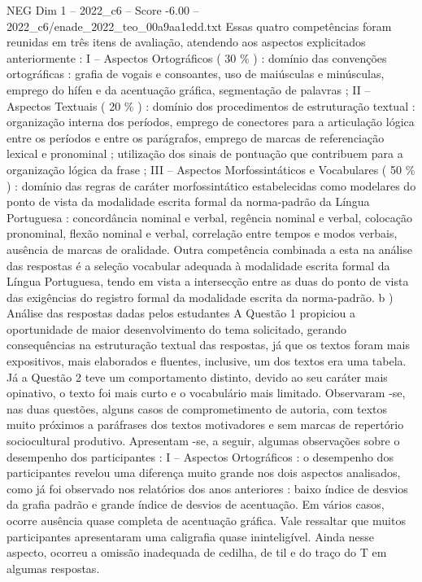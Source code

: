 \begin{textsample}{NEG Dim 1 – 2022\_c6 – Score -6.00 – 2022\_c6/enade\_2022\_teo\_00a9aa1edd.txt}
Essas quatro competências foram reunidas em três itens de avaliação, atendendo aos aspectos explicitados anteriormente : I – Aspectos Ortográficos ( 30 \% ) : domínio das convenções ortográficas : grafia de vogais e consoantes, uso de maiúsculas e minúsculas, emprego do hífen e da acentuação gráfica, segmentação de palavras ; II – Aspectos Textuais ( 20 \% ) : domínio dos procedimentos de estruturação textual : organização interna dos períodos, emprego de conectores para a articulação lógica entre os períodos e entre os parágrafos, emprego de marcas de referenciação lexical e pronominal ; utilização dos sinais de pontuação que contribuem para a organização lógica da frase ; III – Aspectos Morfossintáticos e Vocabulares ( 50 \% ) : domínio das regras de caráter morfossintático estabelecidas como modelares do ponto de vista da modalidade escrita formal da norma-padrão da Língua Portuguesa : concordância nominal e verbal, regência nominal e verbal, colocação pronominal, flexão nominal e verbal, correlação entre tempos e modos verbais, ausência de marcas de oralidade.
Outra competência combinada a esta na análise das respostas é a seleção vocabular adequada à modalidade escrita formal da Língua Portuguesa, tendo em vista a intersecção entre as duas do ponto de vista das exigências do registro formal da modalidade escrita da norma-padrão. b ) Análise das respostas dadas pelos estudantes A Questão 1 propiciou a oportunidade de maior desenvolvimento do tema solicitado, gerando consequências na estruturação textual das respostas, já que os textos foram mais expositivos, mais elaborados e fluentes, inclusive, um dos textos era uma tabela.
Já a Questão 2 teve um comportamento distinto, devido ao seu caráter mais opinativo, o texto foi mais curto e o vocabulário mais limitado.
Observaram -se, nas duas questões, alguns casos de comprometimento de autoria, com textos muito próximos a paráfrases dos textos motivadores e sem marcas de repertório sociocultural produtivo.
Apresentam -se, a seguir, algumas observações sobre o desempenho dos participantes : I – Aspectos Ortográficos : o desempenho dos participantes revelou uma diferença muito grande nos dois aspectos analisados, como já foi observado nos relatórios dos anos anteriores : baixo índice de desvios da grafia padrão e grande índice de desvios de acentuação.
Em vários casos, ocorre ausência quase completa de acentuação gráfica.
Vale ressaltar que muitos participantes apresentaram uma caligrafia quase ininteligível.
Ainda nesse aspecto, ocorreu a omissão inadequada de cedilha, de til e do traço do T em algumas respostas.

\end{textsample}
